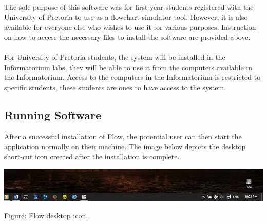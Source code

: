\documentclass[11pt,a4paper,titlepage]{article}
\begin{document}
	The sole purpose of this software was for first year students registered with the University of Pretoria to use as a flowchart simulator tool. However, it is also available for everyone else who wishes to use it for various purposes. Instruction on how to access the necessary files to install the software are provided above.\\
	\\For University of Pretoria students, the system will be installed in the Informatorium labs, they will be able to use it from the computers available in the Informatorium. Access to the computers in the Informatorium is restricted to specific students, these students are ones to have access to the system.\\



	
	\subsection{Running Software}
	
	
		
	
	
		After a successful installation of Flow, the potential user can then start the application normally on their machine. The image below depicts the desktop short-cut icon created after the installation is complete.\newline \newline
		
		\includegraphics[width=14cm]{images/DesktopIcon.jpg}
		\begin{center}
			Figure: Flow desktop icon.\\
		\end{center} 
		
\end{document}
